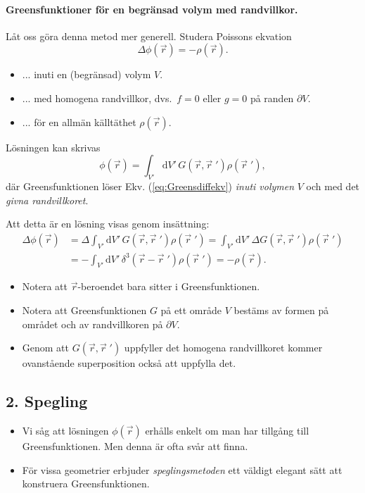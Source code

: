 \documentclass[%
oneside,                 %
final,                   %
10pt]{article}
\begin{document}
\paragraph{Greensfunktioner för en begränsad volym med randvillkor.}
Låt oss göra denna metod mer generell. Studera Poissons ekvation 
$$
\Delta\phi(\vec{r})=-\rho(\vec{r}).
$$ 
\begin{itemize}
\item ... inuti en (begränsad) volym $V$.

\item ... med homogena randvillkor, dvs.~$f=0$ eller $g=0$ på randen $\partial V$.

\item ... för en allmän källtäthet $\rho(\vec{r})$.
\end{itemize}

\noindent
Lösningen kan skrivas
$$
\phi(\vec{r})=\int_{V'}\mbox{d}V'\,G(\vec{r},\vec{r}{\;}')\rho(\vec{r}{\;}'),
$$
där Greensfunktionen löser Ekv. (\ref{eq:Greensdiffekv}) \emph{inuti volymen} $V$ och med det \emph{givna randvillkoret}.

Att detta är en lösning visas genom insättning:
\begin{align}
\Delta\phi(\vec{r}) &= \Delta\int_{V'}\mbox{d}V'\,G(\vec{r},\vec{r}{\;}')\rho(\vec{r}{\;}')
=\int_{V'}\mbox{d}V'\,\Delta G(\vec{r},\vec{r}{\;}')\rho(\vec{r}{\;}') \nonumber \\
&=-\int_{V'}\mbox{d}V'\,\delta^3(\vec{r}-\vec{r}{\;}')\rho(\vec{r}{\;}')
=-\rho(\vec{r}).
\end{align}

\begin{itemize}
\item Notera att $\vec{r}$-beroendet bara sitter i Greensfunktionen.

\item Notera att Greensfunktionen $G$ på ett område $V$ bestäms av formen på området och av randvillkoren på $\partial V$.

\item Genom att $G(\vec{r},\vec{r}{\;}')$ uppfyller det homogena randvillkoret kommer ovanstående superposition också att uppfylla det.
\end{itemize}

\noindent
\subsection*{2. Spegling}

\begin{itemize}
\item Vi såg att lösningen $\phi(\vec{r})$ erhålls enkelt om man har tillgång till Greensfunktionen. Men denna är ofta svår att finna. 

\item För vissa geometrier erbjuder \emph{speglingsmetoden} ett väldigt elegant sätt att konstruera Greensfunktionen.
\end{itemize}
\end{document}
